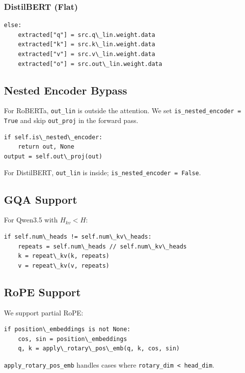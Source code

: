 \subsubsection{DistilBERT (Flat)}

\begin{lstlisting}
else:
    extracted["q"] = src.q\_lin.weight.data
    extracted["k"] = src.k\_lin.weight.data
    extracted["v"] = src.v\_lin.weight.data
    extracted["o"] = src.out\_lin.weight.data
\end{lstlisting}

\subsection{Nested Encoder Bypass}

For RoBERTa, \texttt{out\_lin} is outside the attention. We set 
\texttt{is\_nested\_encoder = True} and skip \texttt{out\_proj} in the forward pass.

\begin{lstlisting}
if self.is\_nested\_encoder:
    return out, None
output = self.out\_proj(out)
\end{lstlisting}

For DistilBERT, \texttt{out\_lin} is inside; \texttt{is\_nested\_encoder = False}.

\subsection{GQA Support}

For Qwen3.5 with $H_{kv} < H$:

\begin{lstlisting}
if self.num\_heads != self.num\_kv\_heads:
    repeats = self.num\_heads // self.num\_kv\_heads
    k = repeat\_kv(k, repeats)
    v = repeat\_kv(v, repeats)
\end{lstlisting}

\subsection{RoPE Support}

We support partial RoPE:

\begin{lstlisting}
if position\_embeddings is not None:
    cos, sin = position\_embeddings
    q, k = apply\_rotary\_pos\_emb(q, k, cos, sin)
\end{lstlisting}

\texttt{apply\_rotary\_pos\_emb} handles cases where \texttt{rotary\_dim \textless{} head\_dim}.

